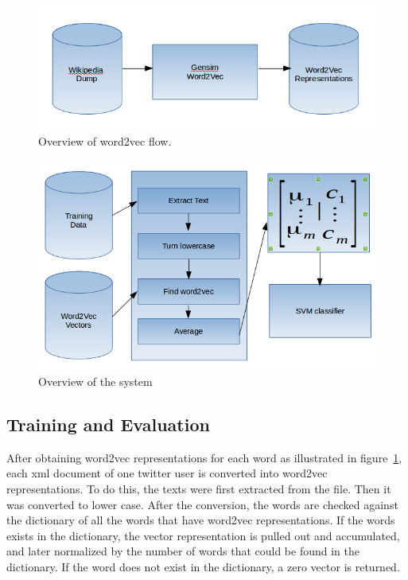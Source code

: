 \documentclass[conference]{IEEEtran}
\begin{document}
\begin{figure}
\centering
\caption{Overview of word2vec flow.}
\label{W2vFlow}
\includegraphics[scale=.5]{Word2Vec.png}
\end{figure}

\begin{figure}
\centering
\caption{Overview of the system}
\label{System}
\includegraphics[scale=.5]{System.png}
\end{figure}
\subsection{Training and Evaluation}
After obtaining word2vec representations for each word as illustrated in figure~\ref{W2vFlow}, each xml document of one twitter user is converted into word2vec representations. To do this, the texts were first extracted from the file. Then it was converted to lower case. After the conversion, the words are checked against the dictionary of all the words that have word2vec representations. If the words exists in the dictionary, the vector representation is pulled out and accumulated, and later normalized by the number of words that could be found in the dictionary. If the word does not exist in the dictionary, a zero vector is returned. 
\end{document}

